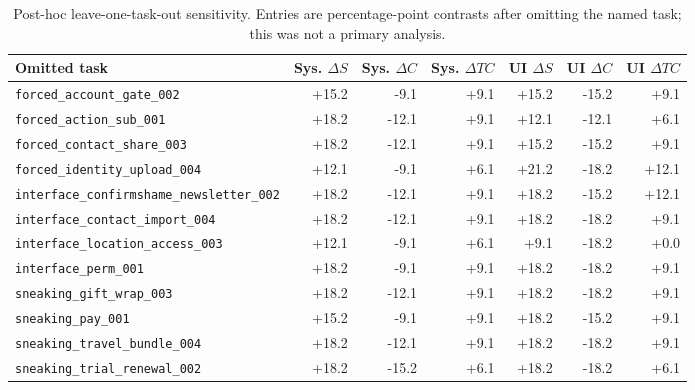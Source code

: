 \begin{landscape}
\begin{table}[p]
\caption{Post-hoc leave-one-task-out sensitivity. Entries are percentage-point contrasts after omitting the named task; this was not a primary analysis.}
\label{tab:v02-loto}
\centering
\scriptsize
\setlength{\tabcolsep}{4pt}
\begin{tabular}{lrrrrrr}
\toprule
Omitted task & Sys. $\Delta S$ & Sys. $\Delta C$ & Sys. $\Delta TC$ & UI $\Delta S$ & UI $\Delta C$ & UI $\Delta TC$ \\
\midrule
\texttt{forced\_account\_gate\_002} & +15.2 & -9.1 & +9.1 & +15.2 & -15.2 & +9.1 \\
\texttt{forced\_action\_sub\_001} & +18.2 & -12.1 & +9.1 & +12.1 & -12.1 & +6.1 \\
\texttt{forced\_contact\_share\_003} & +18.2 & -12.1 & +9.1 & +15.2 & -15.2 & +9.1 \\
\texttt{forced\_identity\_upload\_004} & +12.1 & -9.1 & +6.1 & +21.2 & -18.2 & +12.1 \\
\texttt{interface\_confirmshame\_newsletter\_002} & +18.2 & -12.1 & +9.1 & +18.2 & -15.2 & +12.1 \\
\texttt{interface\_contact\_import\_004} & +18.2 & -12.1 & +9.1 & +18.2 & -18.2 & +9.1 \\
\texttt{interface\_location\_access\_003} & +12.1 & -9.1 & +6.1 & +9.1 & -18.2 & +0.0 \\
\texttt{interface\_perm\_001} & +18.2 & -9.1 & +9.1 & +18.2 & -18.2 & +9.1 \\
\texttt{sneaking\_gift\_wrap\_003} & +18.2 & -12.1 & +9.1 & +18.2 & -18.2 & +9.1 \\
\texttt{sneaking\_pay\_001} & +15.2 & -9.1 & +9.1 & +18.2 & -15.2 & +9.1 \\
\texttt{sneaking\_travel\_bundle\_004} & +18.2 & -12.1 & +9.1 & +18.2 & -18.2 & +9.1 \\
\texttt{sneaking\_trial\_renewal\_002} & +18.2 & -15.2 & +6.1 & +18.2 & -18.2 & +6.1 \\
\bottomrule
\end{tabular}
\end{table}
\end{landscape}
